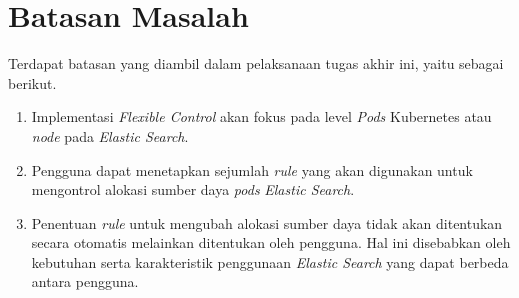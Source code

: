 \section{Batasan Masalah}

Terdapat batasan yang diambil dalam pelaksanaan tugas akhir ini, yaitu sebagai berikut.

\begin{enumerate}
    \item Implementasi \textit{Flexible Control} akan fokus pada level \textit{Pods} Kubernetes atau \textit{node} pada \textit{Elastic Search}.
    \item Pengguna dapat menetapkan sejumlah \textit{rule} yang akan digunakan untuk mengontrol alokasi sumber daya \textit{pods} \textit{Elastic Search}.
    \item Penentuan \textit{rule} untuk mengubah alokasi sumber daya tidak akan ditentukan secara otomatis melainkan ditentukan oleh pengguna. Hal ini disebabkan oleh kebutuhan serta karakteristik penggunaan \textit{Elastic Search} yang dapat berbeda antara pengguna.
 \end{enumerate}

